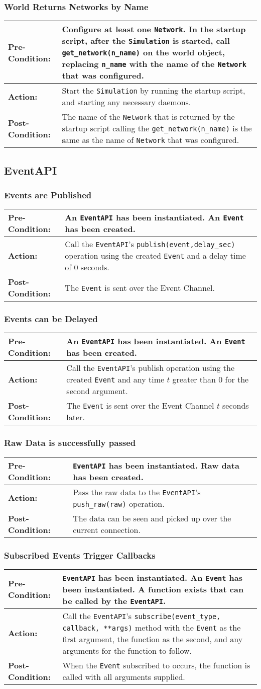\documentclass[titlepage]{article}
\newcommand{\testcase}[3]{
    \begin{center}
    \begin{tabular}{| l | p{0.7\textwidth}|}
        \hline
        \rowcolor[gray]{0.8}\textbf{Pre-Condition:} & #1 \\ \hline
        \textbf{Action:} & #2 \\ \hline
        \rowcolor[gray]{0.8}\textbf{Post-Condition:} & #3 \\ \hline
    \end{tabular}
    \end{center}
}
\begin{document}
\subsubsection{World Returns Networks by Name}
\testcase{Configure at least one \texttt{Network}.  In the startup script, after the \texttt{Simulation} is started, call \texttt{get\_network(n\_name)} on the world object, replacing \texttt{n\_name} with the name of the \texttt{Network} that was configured.}{Start the \texttt{Simulation} by running the startup script, and starting any necessary daemons.}{The name of the \texttt{Network} that is returned by the startup script calling the \texttt{get\_network(n\_name)} is the same as the name of \texttt{Network} that was configured.}

\subsection{EventAPI}
\subsubsection{Events are Published}
\testcase{An \texttt{EventAPI} has been instantiated. An \texttt{Event} has been created.}{Call the \texttt{EventAPI}'s \texttt{publish(event,delay\_sec)} operation using the created \texttt{Event} and a delay time of 0 seconds.}{The \texttt{Event} is sent over the Event Channel.}

\subsubsection{Events can be Delayed}
\testcase{An \texttt{EventAPI} has been instantiated. An \texttt{Event} has been created.}{Call the \texttt{EventAPI}'s publish operation using the created \texttt{Event} and any time $t$ greater than 0 for the second argument.}{The \texttt{Event} is sent over the Event Channel $t$ seconds later.}

\subsubsection{Raw Data is successfully passed}
\testcase{\texttt{EventAPI} has been instantiated. Raw data has been created.}{Pass the raw data to the \texttt{EventAPI}'s \texttt{push\_raw(raw)} operation.}{The data can be seen and picked up over the current connection.}

\subsubsection{Subscribed Events Trigger Callbacks}
\testcase{\texttt{EventAPI} has been instantiated.  An \texttt{Event} has been instantiated. A function exists that can be called by the \texttt{EventAPI}.}{Call the \texttt{EventAPI}'s \texttt{subscribe(event\_type, callback, **args)} method with the \texttt{Event} as the first argument, the function as the second, and any arguments for the function to follow.}{When the \texttt{Event} subscribed to occurs, the function is called with all arguments supplied. }
\end{document}
